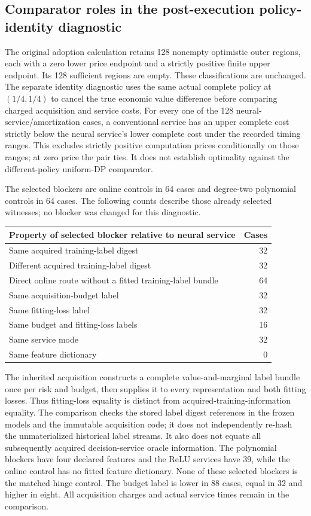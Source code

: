 \subsection{Comparator roles in the post-execution policy-identity diagnostic}
\label{dev:identitycomparators125}
The original adoption calculation retains 128 nonempty optimistic outer
regions, each with a zero lower price endpoint and a strictly positive
finite upper endpoint. Its 128 sufficient regions are empty. These
classifications are unchanged. The separate identity diagnostic uses
the same actual complete policy at $(1/4,1/4)$ to cancel the true economic
value difference before comparing charged acquisition and service costs.
For every one of the 128 neural-service/amortization cases, a conventional
service has an upper complete cost strictly below the neural service's
lower complete cost under the recorded timing ranges. This excludes
strictly positive computation prices conditionally on those ranges;
at zero price the pair ties. It does not establish optimality against
the different-policy uniform-DP comparator.

The selected blockers are online controls in 64 cases and degree-two
polynomial controls in 64 cases. The following counts describe those
already selected witnesses; no blocker was changed for this diagnostic.
\begin{center}\small
\begin{tabular}{lr}
\hline
Property of selected blocker relative to neural service & Cases \\
\hline
Same acquired training-label digest & 32 \\
Different acquired training-label digest & 32 \\
Direct online route without a fitted training-label bundle & 64 \\
Same acquisition-budget label & 32 \\
Same fitting-loss label & 32 \\
Same budget and fitting-loss labels & 16 \\
Same service mode & 32 \\
Same feature dictionary & 0 \\
\hline
\end{tabular}
\end{center}
The inherited acquisition constructs a complete value-and-marginal label
bundle once per risk and budget, then supplies it to every representation
and both fitting losses. Thus fitting-loss equality is distinct from
acquired-training-information equality. The comparison checks the stored
label digest references in the frozen models and the immutable acquisition
code; it does not independently re-hash the unmaterialized historical
label streams. It also does not equate all subsequently acquired
decision-service oracle information. The polynomial blockers have four
declared features and the ReLU services have 39, while the online control
has no fitted feature dictionary. None of these selected blockers is
the matched hinge control. The budget label is lower in 88 cases, equal
in 32 and higher in eight. All acquisition charges and actual service
times remain in the comparison.

